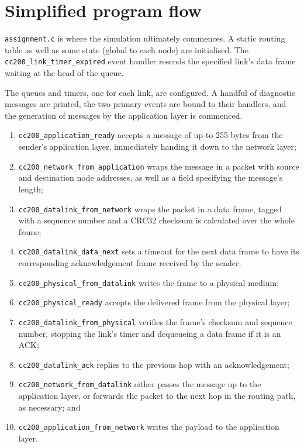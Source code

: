 \documentclass[a4paper,12pt,titlepage]{article}
\begin{document}
\section{Simplified program flow}

\texttt{assignment.c} is where the simulation ultimately commences. A static
routing table as well as some state (global to each node) are initialised. The
\texttt{cc200\_link\_timer\_expired} event handler resends the specified link's
data frame waiting at the head of the queue.

The queues and timers, one for each link, are configured. A handful of
diagnostic messages are printed, the two primary events are bound to their
handlers, and the generation of messages by the application layer is commenced.

\begin{enumerate}
	\item \texttt{cc200\_application\_ready} accepts a message of up to 255
	      bytes from the sender's application layer, immediately handing it
	      down to the network layer;
	\item \texttt{cc200\_network\_from\_application} wraps the message in
	      a packet with source and destination node addresses, as well as
	      a field specifying the message's length;
	\item \texttt{cc200\_datalink\_from\_network} wraps the packet in a
	      data frame, tagged with a sequence number and a CRC32 checksum
	      is calculated over the whole frame;
	\item \texttt{cc200\_datalink\_data\_next} sets a timeout for the next
	      data frame to have its corresponding acknowledgement frame
	      received by the sender;
	\item \texttt{cc200\_physical\_from\_datalink} writes the frame to a
	      physical medium;
	\item \texttt{cc200\_physical\_ready} accepts the delivered frame
	      from the physical layer;
	\item \texttt{cc200\_datalink\_from\_physical} verifies the frame's
	      checksum and sequence number, stopping the link's timer and
	      dequeueing a data frame if it is an ACK;
	\item \texttt{cc200\_datalink\_ack} replies to the previous hop with an
	      acknowledgement;
	\item \texttt{cc200\_network\_from\_datalink} either passes the message
	      up to the application layer, or forwards the packet to the next
	      hop in the routing path, as necessary; and
	\item \texttt{cc200\_application\_from\_network} writes the
	      payload to the application layer.
\end{enumerate}
\end{document}
